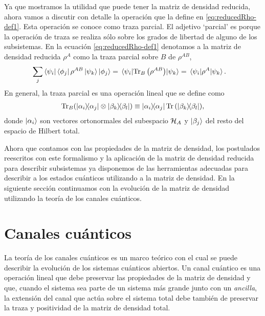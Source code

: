 Ya que mostramos la utilidad que puede tener la matriz de densidad
reducida, ahora vamos a discutir con detalle la operación que 
la define en \eqref{eq:reducedRho-def1}. 
Esta operación se conoce como traza parcial. El adjetivo `parcial'
es porque la operación de traza se realiza sólo sobre los grados 
de libertad de alguno de los subsistemas. En la ecuación 
\eqref{eq:reducedRho-def1} denotamos a la matriz de densidad 
reducida $\rho^A$ como la traza parcial sobre $B$ de $\rho^{AB}$,
\begin{align} 
	\sum _j \bra{\psi_i}\bra{\phi_j}\rho^{AB}\ket{\psi_k}\ket{\phi_j}
	&=\matrixel{\psi_i}{\Tr_B\qty(\rho^{AB})}{\psi_k}
	= \matrixel{\psi_i}{\rho^A}{\psi_k}.
	\label{eq:partialTrace-def}
\end{align}
En general, la traza parcial es una operación lineal
que se define como~\cite{nielsen_chuang_2011}
\begin{align}
	\Tr_B (\dyad{\alpha_i}{\alpha_j}\otimes \dyad{\beta_k}{\beta_l})
	\equiv
	\dyad{\alpha_i}{\alpha_j}\Tr \qty(\dyad{\beta_k}{\beta_l}),
	\label{eq:part_trace-def}
\end{align}
donde $\ket{\alpha_i}$ son vectores ortonormales del subespacio $\mathcal{H}_A$
y $\ket{\beta_j}$ del resto del espacio de Hilbert total.   

Ahora que contamos con las propiedades de la matriz de densidad, 
los postulados reescritos con este formalismo y la aplicación de la matriz
de densidad reducida para describir subsistemas ya disponemos de
las herramientas adecuadas para describir a los estados cuánticos 
utilizando a la matriz de densidad. En la siguiente sección continuamos 
con la evolución de la matriz de densidad utilizando la teoría de los 
canales cuánticos.

\section{Canales cuánticos}\label{sec:qtm-channels} %

La teoría de los canales cuánticos es un marco teórico con el cual 
se puede describir la evolución de los sistemas cuánticos abiertos.
Un canal cuántico es una operación lineal que debe preservar las 
propiedades de la matriz de densidad y que, cuando el sistema sea
parte de un sistema más grande junto con un \textit{ancilla}, la
extensión del canal que actúa sobre el sistema total debe también 
de preservar la traza y positividad de la matriz de densidad total.


